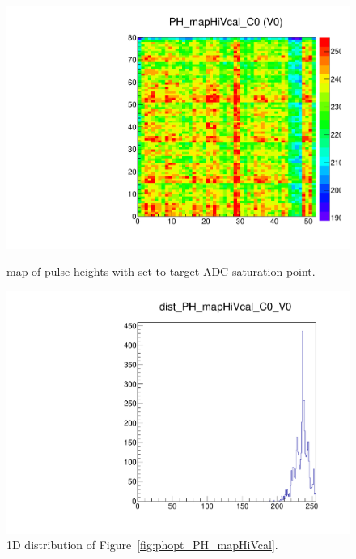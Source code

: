 \begin{figure}[!htp]
\centering
\begin{minipage}{0.45\textwidth}
  \includegraphics[width=1.0\textwidth]{figures/phopt_PH_mapHiVcal.pdf}
  \caption{\roc map of pulse heights with \vcal set to target ADC saturation point.}
  \label{fig:phopt_PH_mapHiVcal}
\end{minipage}
\hspace{0.3cm}
\begin{minipage}{0.45\textwidth}
  \includegraphics[width=1.0\textwidth]{figures/phopt_dist_PH_mapHiVcal.pdf}
  \caption{1D distribution of Figure~\ref{fig:phopt_PH_mapHiVcal}.}
  \label{fig:phopt_dist_PH_mapHiVcal}
\end{minipage}
\end{figure}

